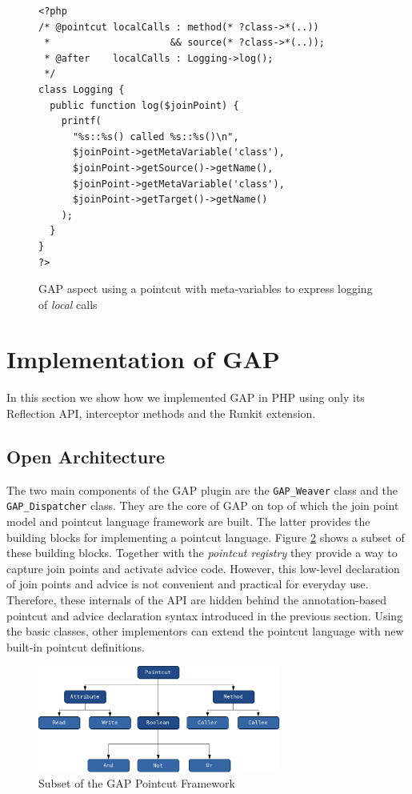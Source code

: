 \documentclass{acm_proc_article-sp}
\begin{document}
\begin{figure}[t]
\centering
\small{
\begin{verbatim}
<?php
/* @pointcut localCalls : method(* ?class->*(..))
 *                     && source(* ?class->*(..));
 * @after    localCalls : Logging->log();
 */
class Logging {
  public function log($joinPoint) {
    printf(
      "%s::%s() called %s::%s()\n",
      $joinPoint->getMetaVariable('class'),
      $joinPoint->getSource()->getName(),
      $joinPoint->getMetaVariable('class'),
      $joinPoint->getTarget()->getName()
    );
  }
}
?>
\end{verbatim}}
\caption{GAP aspect using a pointcut with meta-variables
 to express logging of \emph{local} calls}
\label{fig:LoggingAspect-MetaVariables}
\end{figure}

\section{Implementation of GAP}
In this section we show how we implemented GAP in PHP using only
its Reflection API, interceptor methods and the Runkit extension.

\subsection{Open Architecture}
\label{OpenArchitecture} The two main components of the GAP plugin
are the \texttt{GAP\_Weaver} class and the
\texttt{GAP\_Dispatcher} class. They are the core of GAP on top of
which the join point model and pointcut language framework are
built. The latter provides the building blocks for implementing a
pointcut language. Figure \ref{POINTCUT-FRAMEWORK} shows a subset
of these building blocks. Together with the \emph{pointcut
registry} they provide a way to capture join points and activate
advice code. However, this low-level declaration of join points
and advice is not convenient and practical for everyday use.
Therefore, these internals of the API are hidden behind the
annotation-based pointcut and advice declaration syntax introduced
in the previous section. Using the basic classes, other
implementors can extend the pointcut language with new built-in
pointcut definitions.

\begin{figure}%
\centering
\includegraphics[width=8cm]{gap_pointcut_framework}
\caption{Subset of the GAP Pointcut Framework}
\label{POINTCUT-FRAMEWORK}
\end{figure}
\end{document}
